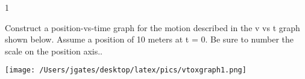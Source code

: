 
\AddToShipoutPicture*{\BackgroundPic}

\addtocounter {ProbNum} {1}

 
{\bf \Large{}} Construct a position-vs-time graph for the motion described in the v vs t graph shown below. Assume a position of 10 meters at t = 0. Be sure to number the scale on the position axis.. 

\bigskip

\begin{center}
\texttt{[image: /Users/jgates/desktop/latex/pics/vtoxgraph1.png]}
\end{center}

\vfill

\newpage